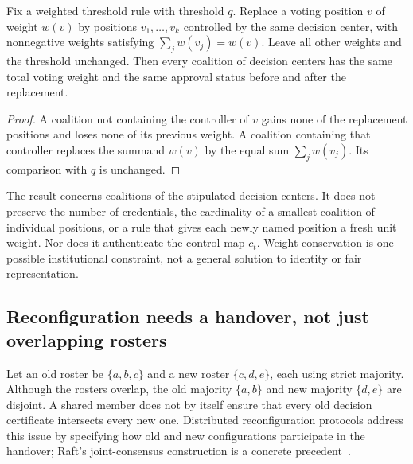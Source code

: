 \begin{MSproposition}\label{MS:prop:forkweight}
Fix a weighted threshold rule with threshold $q$. Replace a voting position $v$ of weight $w(v)$ by positions $v_1,\ldots,v_k$ controlled by the same decision center, with nonnegative weights satisfying $\sum_j w(v_j)=w(v)$. Leave all other weights and the threshold unchanged. Then every coalition of decision centers has the same total voting weight and the same approval status before and after the replacement.
\end{MSproposition}
\begin{proof}
A coalition not containing the controller of $v$ gains none of the replacement positions and loses none of its previous weight. A coalition containing that controller replaces the summand $w(v)$ by the equal sum $\sum_jw(v_j)$. Its comparison with $q$ is unchanged.
\end{proof}

The result concerns coalitions of the stipulated decision centers. It does not preserve the number of credentials, the cardinality of a smallest coalition of individual positions, or a rule that gives each newly named position a fresh unit weight. Nor does it authenticate the control map $c_t$. Weight conservation is one possible institutional constraint, not a general solution to identity or fair representation.

\subsection{Reconfiguration needs a handover, not just overlapping rosters}
Let an old roster be $\{a,b,c\}$ and a new roster $\{c,d,e\}$, each using strict majority. Although the rosters overlap, the old majority $\{a,b\}$ and new majority $\{d,e\}$ are disjoint. A shared member does not by itself ensure that every old decision certificate intersects every new one. Distributed reconfiguration protocols address this issue by specifying how old and new configurations participate in the handover; Raft's joint-consensus construction is a concrete precedent~\cite{MS:ongaro}.

